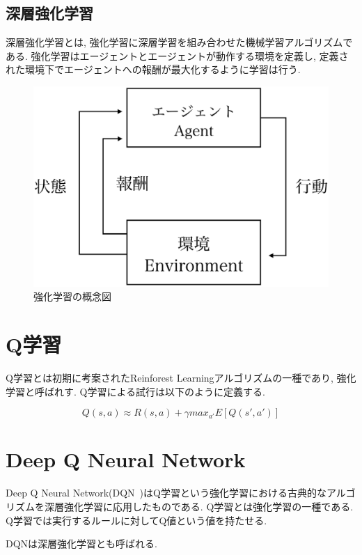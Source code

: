 \subsection{深層強化学習}

深層強化学習とは, 強化学習に深層学習を組み合わせた機械学習アルゴリズムである.
強化学習はエージェントとエージェントが動作する環境を定義し, 定義された環境下でエージェントへの報酬が最大化するように学習は行う.


\begin{figure}[H]
    \centering
    \includegraphics[clip,width = 12.0cm]{assets/reinforcement_learning.eps}
    \caption{強化学習の概念図}  \label{sample}
\end{figure}

\section{Q学習}

Q学習とは初期に考案されたReinforest Learningアルゴリズムの一種であり, 強化学習と呼ばれす.
Q学習による試行は以下のように定義する.

\begin{equation}
    Q(s, a) \approx R(s, a) + \gamma max_{a'} E[Q(s', a')]
\end{equation}

\section{Deep Q Neural Network}

Deep Q Neural Network(DQN~\cite{DQN})はQ学習という強化学習における古典的なアルゴリズムを深層強化学習に応用したものである.
Q学習とは強化学習の一種である. Q学習では実行するルールに対してQ値という値を持たせる.

DQNは深層強化学習とも呼ばれる.


